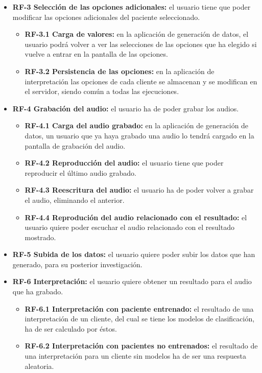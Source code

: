\begin{itemize}
\begin{itemize}
	\end{itemize}
	\item \textbf{RF-3 Selección de las opciones adicionales:} el usuario tiene que poder modificar las opciones adicionales del paciente seleccionado.
	\begin{itemize}
		\item \textbf{RF-3.1 Carga de valores:} en la aplicación de generación de datos, el usuario podrá volver a ver las selecciones de las opciones que ha elegido si vuelve a entrar en la pantalla de las opciones.
		\item \textbf{RF-3.2 Persistencia de las opciones:} en la aplicación de interpretación las opciones de cada cliente se almacenan y se modifican en el servidor, siendo común a todas las ejecuciones.
	\end{itemize}
	\item \textbf{RF-4 Grabación del audio:} el usuario ha de poder grabar los audios.
	\begin{itemize}
		\item \textbf{RF-4.1 Carga del audio grabado:} en la aplicación de generación de datos, un usuario que ya haya grabado una audio lo tendrá cargado en la pantalla de grabación del audio.
		\item \textbf{RF-4.2 Reproducción del audio:} el usuario tiene que poder reproducir el último audio grabado.
		\item \textbf{RF-4.3 Reescritura del audio:} el usuario ha de poder volver a grabar el audio, eliminando el anterior.
		\item \textbf{RF-4.4 Reprodución del audio relacionado con el resultado:} el usuario quiere poder escuchar el audio relacionado con el resultado mostrado.
	\end{itemize}
	\item \textbf{RF-5 Subida de los datos:} el usuario quiere poder subir los datos que han generado, para su posterior investigación.
	\item \textbf{RF-6 Interpretación:} el usuario quiere obtener un resultado para el audio que ha grabado.
	\begin{itemize}
		\item \textbf{RF-6.1 Interpretación con paciente entrenado:} el resultado de una interpretación de un cliente, del cual se tiene los modelos de clasificación, ha de ser calculado por éstos.
		\item \textbf{RF-6.2 Interpretación con pacientes no entrenados:} el resultado de una interpretación para un cliente sin modelos ha de ser una respuesta aleatoria.

\end{itemize}
\end{itemize}
